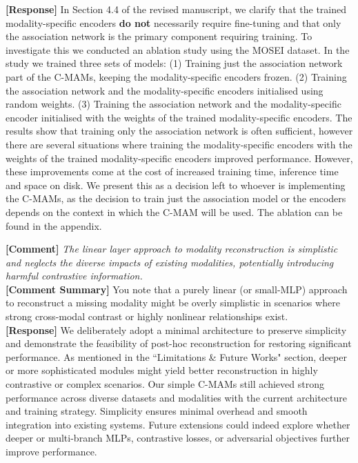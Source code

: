 \documentclass{article}
\begin{document}
\noindent\textbf{[Response]} In Section 4.4 of the revised manuscript, we clarify that the trained modality-specific encoders \textbf{do not} necessarily require fine-tuning and that only the association network is the primary component requiring training. To investigate this we conducted an ablation study using the MOSEI dataset. In the study we trained three sets of models: (1) Training just the association network part of the C-MAMs, keeping the modality-specific encoders frozen. (2) Training the association network and the modality-specific encoders initialised using random weights. (3) Training the association network and the modality-specific encoder initialised with the weights of the trained modality-specific encoders. The results show that training only the association network is often sufficient, however there are several situations where training the modality-specific encoders with the weights of the trained modality-specific encoders improved performance. However, these improvements come at the cost of increased training time, inference time and space on disk. We present this as a decision left to whoever is implementing the C-MAMs, as the decision to train just the association model or the encoders depends on the context in which the C-MAM will be used. The ablation can be found in the appendix. 

\vspace{0.25cm}
\hline
\vspace{0.25cm}

\noindent\textbf{[Comment]} \textit{The linear layer approach to modality reconstruction is simplistic and neglects the diverse impacts of existing modalities, potentially introducing harmful contrastive information.}
\\

\noindent\textbf{[Comment Summary]} You note that a purely linear (or small-MLP) approach to reconstruct a missing modality might be overly simplistic in scenarios where strong cross-modal contrast or highly nonlinear relationships exist.
\\

\noindent\textbf{[Response]} We deliberately adopt a minimal architecture to preserve simplicity and demonstrate the feasibility of post-hoc reconstruction for restoring significant performance. As mentioned in the ``Limitations \& Future Works" section, deeper or more sophisticated modules might yield better reconstruction in highly contrastive or complex scenarios. Our simple C-MAMs still achieved strong performance across diverse datasets and modalities with the current architecture and training strategy. Simplicity ensures minimal overhead and smooth integration into existing systems. Future extensions could indeed explore whether deeper or multi-branch MLPs, contrastive losses, or adversarial objectives further improve performance.
\end{document}

